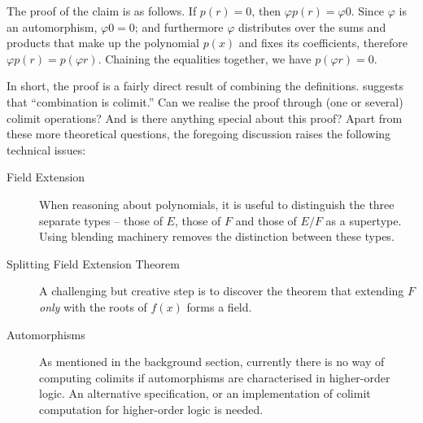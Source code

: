The proof of the claim is as follows.  If $p(r)=0$, then $\varphi
p(r)=\varphi 0$.  Since $\varphi$ is an automorphism, $\varphi 0 = 0$;
and furthermore $\varphi$ distributes over the sums and products that
make up the polynomial $p(x)$ and fixes its coefficients, therefore
$\varphi p(r)=p(\varphi r)$.  Chaining the equalities together, we
have $p(\varphi r)=0$.

In short, the proof is a fairly direct result of combining the
definitions.  \textcite{Goguen92sheafsemantics} suggests that
``combination is colimit.''  Can we realise the proof through (one or
several) colimit operations?  And is there anything special about this
proof?  Apart from these more theoretical questions, the foregoing
discussion raises the following technical issues:

\begin{description}
\item[Field Extension] When reasoning about polynomials, it is useful
  to distinguish the three separate types -- those of $E$, those of
  $F$ and those of $E/F$ as a supertype. Using blending machinery
  removes the distinction between these types.
\item[Splitting Field Extension Theorem] A challenging but creative
  step is to discover the theorem that extending $F$ {\em only} with
  the roots of $f(x)$ forms a field.
\item[Automorphisms] As mentioned in the background section,
  currently there is no way of computing colimits if automorphisms
  are characterised in higher-order logic. An alternative specification,
  or an implementation of colimit computation for higher-order
  logic is needed.

\end{description}

% 

